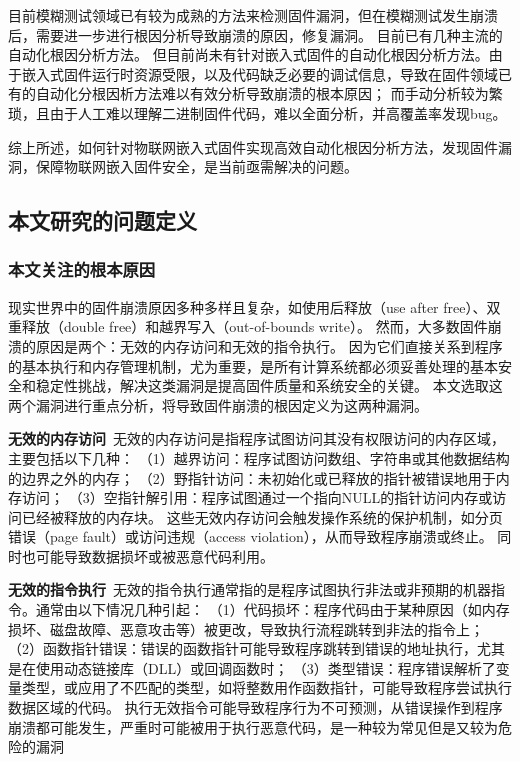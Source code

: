 目前模糊测试领域已有较为成熟的方法来检测固件漏洞，但在模糊测试发生崩溃后，需要进一步进行根因分析导致崩溃的原因，修复漏洞。
目前已有几种主流的自动化根因分析方法。
但目前尚未有针对嵌入式固件的自动化根因分析方法。由于嵌入式固件运行时资源受限，以及代码缺乏必要的调试信息，导致在固件领域已有的自动化分根因析方法难以有效分析导致崩溃的根本原因；
而手动分析较为繁琐，且由于人工难以理解二进制固件代码，难以全面分析，并高覆盖率发现bug。

综上所述，如何针对物联网嵌入式固件实现高效自动化根因分析方法，发现固件漏洞，保障物联网嵌入固件安全，是当前亟需解决的问题。

\subsection{本文研究的问题定义}             %
\subsubsection{本文关注的根本原因}          %
现实世界中的固件崩溃原因多种多样且复杂，如使用后释放（use after free）、双重释放（double free）和越界写入（out-of-bounds write）。
然而，大多数固件崩溃的原因是两个：无效的内存访问和无效的指令执行。
因为它们直接关系到程序的基本执行和内存管理机制，尤为重要，是所有计算系统都必须妥善处理的基本安全和稳定性挑战，解决这类漏洞是提高固件质量和系统安全的关键。
本文选取这两个漏洞进行重点分析，将导致固件崩溃的根因定义为这两种漏洞。

\textbf{无效的内存访问}\ 无效的内存访问是指程序试图访问其没有权限访问的内存区域，主要包括以下几种：
（1）越界访问：程序试图访问数组、字符串或其他数据结构的边界之外的内存；
（2）野指针访问：未初始化或已释放的指针被错误地用于内存访问；
（3）空指针解引用：程序试图通过一个指向NULL的指针访问内存或访问已经被释放的内存块。
这些无效内存访问会触发操作系统的保护机制，如分页错误（page fault）或访问违规（access violation），从而导致程序崩溃或终止。
同时也可能导致数据损坏或被恶意代码利用。

\textbf{无效的指令执行}\ 无效的指令执行通常指的是程序试图执行非法或非预期的机器指令。通常由以下情况几种引起：
（1）代码损坏：程序代码由于某种原因（如内存损坏、磁盘故障、恶意攻击等）被更改，导致执行流程跳转到非法的指令上；
（2）函数指针错误：错误的函数指针可能导致程序跳转到错误的地址执行，尤其是在使用动态链接库（DLL）或回调函数时；
（3）类型错误：程序错误解析了变量类型，或应用了不匹配的类型，如将整数用作函数指针，可能导致程序尝试执行数据区域的代码。
执行无效指令可能导致程序行为不可预测，从错误操作到程序崩溃都可能发生，严重时可能被用于执行恶意代码，是一种较为常见但是又较为危险的漏洞

